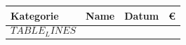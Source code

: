 
\begin{center}
    \footnotesize
    \begin{longtable}{l l r r}
        Kategorie&Name&Datum&€\\
        \hline
        $$TABLE_LINES$$
    \end{longtable}
\end{center}
